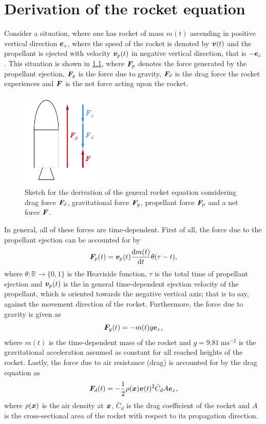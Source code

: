 \documentclass[a4paper,11pt]{report}
\begin{document}
\chapter{Derivation of the rocket equation}
Consider a situation, where one has rocket of mass $m(t)$ ascending in positive vertical direction $\bm{e}_z$, where the speed of the rocket is denoted by $\bm{v}(t)$ and the propellant is ejected with velocity $\bm{v}_p(t)$ in negative vertical direction, that is $-\bm{e}_z$. This situation is shown in \cref{fig:rocketequation}, where $\bm{F}_p$ denotes the force generated by the propellant ejection, $\bm{F}_g$ is the force due to gravity, $\bm{F}_d$ is the drag force the rocket experiences and $\bm{F}$ is the net force acting upon the rocket. 
\begin{figure}[h]
	\centering
	\includegraphics[width=4cm]{figures/rocketequationderivation.pdf}
	\caption{Sketch for the derivation of the general rocket equation considering drag force $\bm{F}_d$, gravitational force $\bm{F}_g$, propellant force $\bm{F}_p$ and a net force $\bm{F}$.}
	\label{fig:rocketequation}
\end{figure} In general, all of these forces are time-dependent. First of all, the force due to the propellant ejection can be accounted for by \begin{equation}
\bm{F}_p(t) = \bm{v}_p(t)\frac{\mathrm{d}m(t)}{\mathrm{d}t}\theta(\tau-t),
\end{equation} where $\theta: \mathbb{R}\rightarrow \{0,1\}$ is the Heaviside function, $\tau$ is the total time of propellant ejection and $\bm{v}_p(t)$ is the in general time-dependent ejection velocity of the propellant, which is oriented towards the negative vertical axis; that is to say, against the movement direction of the rocket. Furthermore, the force due to gravity is given as \begin{equation}
\bm{F}_g(t) = -m(t)g\bm{e}_z,
\end{equation} where $m(t)$ is the time-dependent mass of the rocket and $g=\SI{9.81}{\meter\second^{-2}}$ is the gravitational acceleration assumed as constant for all reached heights of the rocket. Lastly, the force due to air resistance (drag) is accounted for by the drag equation as \begin{equation}
\bm{F}_d(t) = -\frac{1}{2}\rho(\bm{x})\bm{v}(t)^2 \bar{C}_d A \bm{e}_z,
\end{equation} where $\rho(\bm{x})$ is the air density at $\bm{x}$, $\bar{C}_d$ is the drag coefficient of the rocket and $A$ is the cross-sectional area of the rocket with respect to its propagation direction.
\end{document}
